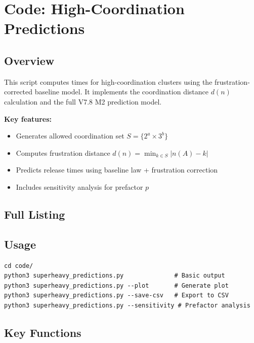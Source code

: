 
\chapter{Code: High-Coordination Predictions}
\label{app:superheavy}

\section{Overview}

This script computes \ClosedFourRelease{} times for high-coordination clusters using the
frustration-corrected baseline model. It implements the coordination distance
$d(n)$ calculation and the full V7.8 M2 prediction model.

\textbf{Key features:}
\begin{itemize}
    \item Generates allowed coordination set $S = \{2^a \times 3^b\}$
    \item Computes frustration distance $d(n) = \min_{k \in S} |n(A) - k|$
    \item Predicts release times using baseline law + frustration correction
    \item Includes sensitivity analysis for prefactor $p$
\end{itemize}

\section{Full Listing}



\section{Usage}

\begin{verbatim}
cd code/
python3 superheavy_predictions.py              # Basic output
python3 superheavy_predictions.py --plot       # Generate plot
python3 superheavy_predictions.py --save-csv   # Export to CSV
python3 superheavy_predictions.py --sensitivity # Prefactor analysis
\end{verbatim}

\section{Key Functions}

